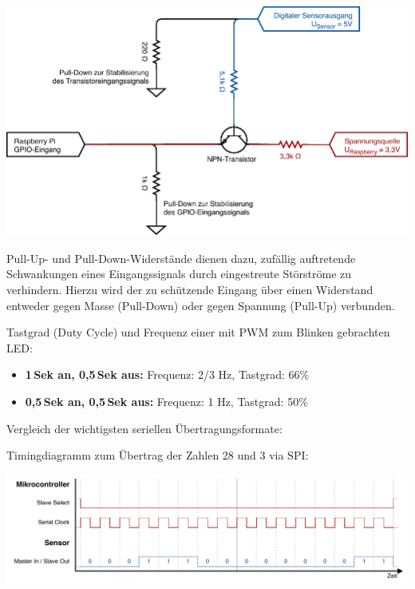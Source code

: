 \includegraphics[width=\textwidth]{2-hardwaredesign/img/transistor_sensor_schaltplan}

\bigskip
\teilaufgabe
Pull-Up- und Pull-Down-Widerstände dienen dazu, zufällig auftretende Schwankungen
eines Eingangssignals durch eingestreute Störströme zu verhindern. Hierzu wird
der zu schützende Eingang über einen Widerstand entweder gegen Masse (Pull-Down)
oder gegen Spannung (Pull-Up) verbunden.

\bigskip
\teilaufgabe
Tastgrad (Duty Cycle) und Frequenz einer mit PWM zum Blinken gebrachten LED:

\begin{itemize}
    \item \textbf{1\,Sek an, 0,5\,Sek aus:}
    Frequenz: 2/3 Hz, Tastgrad: 66\%

    \item \textbf{0,5\,Sek an, 0,5\,Sek aus:}
    Frequenz: 1 Hz, Tastgrad: 50\%
\end{itemize}

\clearpage

\teilaufgabe
Vergleich der wichtigsten seriellen Übertragungsformate:


\bigskip
\teilaufgabe
Timingdiagramm zum Übertrag der Zahlen 28 und 3 via SPI:

\includegraphics[width=\textwidth]{2-hardwaredesign/img/spi_timingdiagramm}

